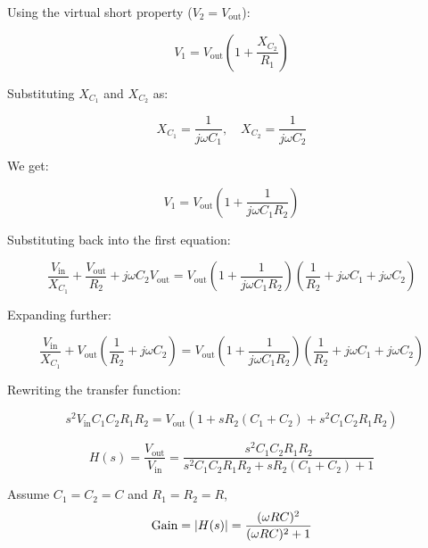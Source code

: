 \documentclass[12pt]{article}
\begin{document}
Using the virtual short property ($V_2 = V_{\text{out}}$):

\begin{equation*}
V_1 = V_{\text{out}} \left( 1 + \frac{X_{C_2}}{R_1} \right)
\end{equation*}

Substituting $X_{C_1}$ and $X_{C_2}$ as:

\begin{equation*}
X_{C_1} = \frac{1}{j\omega C_1}, \quad X_{C_2} = \frac{1}{j\omega C_2}
\end{equation*}

We get:

\begin{equation*}
V_1 = V_{\text{out}} \left( 1 + \frac{1}{j\omega C_1 R_2} \right)
\end{equation*}

Substituting back into the first equation:

\begin{equation*}
\frac{V_{\text{in}}}{X_{C_1}} + \frac{V_{\text{out}}}{R_2} + j\omega C_2V_{\text{out}} = V_{\text{out}} \left( 1 + \frac{1}{j\omega C_1 R_2} \right) \left( \frac{1}{R_2} + j\omega C_1 + j\omega C_2 \right)
\end{equation*}

Expanding further:

\begin{equation*}
\frac{V_{\text{in}}}{X_{C_1}} + V_{\text{out}} \left( \frac{1}{R_2} + j\omega C_2 \right) = V_{\text{out}} \left( 1 + \frac{1}{j\omega C_1 R_2} \right) \left( \frac{1}{R_2} + j\omega C_1 + j\omega C_2 \right)
\end{equation*}

Rewriting the transfer function:

\begin{equation*}
s^2 V_{\text{in}} C_1 C_2 R_1 R_2= V_{\text{out}} \left( 1 + s R_2 (C_1 + C_2) + s^2 C_1 C_2 R_1 R_2 \right)
\end{equation*}

\begin{equation*}
H(s) = \frac{V_{\text{out}}}{V_{\text{in}}} = \frac{s^2C_1 C_2 R_1 R_2}{s^2 C_1 C_2 R_1 R_2 + s R_2 (C_1 + C_2) + 1}
\end{equation*}

Assume $C_1 = C_2 = C$ and $R_1 = R_2 = R$,
\begin{align*}
    \text{Gain} = \abs{H(s)} = \frac{(\omega RC)^2}{(\omega RC)^2 + 1}
\end{align*}
\end{document}
